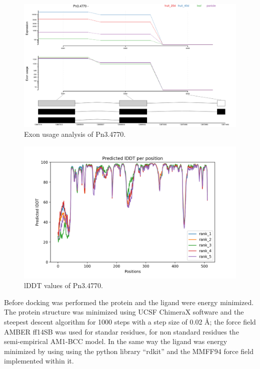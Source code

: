 \documentclass[12pt]{article}
\begin{document}
	\FloatBarrier
	\begin{figure}[h!]
		\centering
		\includegraphics[width=\textwidth-50pt]{../5/known/Transcripts/7.png}
		\caption{Exon usage analysis of Pn3.4770.}
		\label{fig5k_1}
	\end{figure}
	\FloatBarrier
	
	\FloatBarrier
	\begin{figure}[h!]
		\centering
		\includegraphics[width=\textwidth-50pt]{../5/known/AlphaFold2/Met_dioixi_ef326_plddt.png}
		\caption{lDDT values of Pn3.4770.}
		\label{fig5k_3}
	\end{figure}
	\FloatBarrier
	
	\newpage
	
	Before docking was performed the protein and the ligand were energy minimized. The protein structure was minimized using UCSF ChimeraX software \cite{chimera,chimera_2} and the steepest descent algorithm for 1000 steps with a step size of 0.02 \r{A}; the force field AMBER ff14SB was used for standar residues, for non standard residues the semi-empirical AM1-BCC model. \cite{am1_bcc,am1_bcc_2,am1_bcc_3} In the same way the ligand was energy minimized by using using the python library ``rdkit'' and the MMFF94 force field implemented within it. \cite{rdkit,rdkit_mmff}
	
\end{document}
